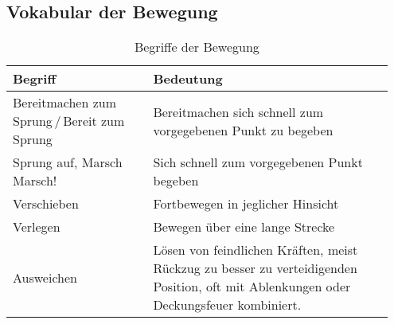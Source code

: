 \subsection{Vokabular der Bewegung}
	\begin{longtable}{P{0.35\linewidth}P{0.6\linewidth}}
		\caption[Vokabular Bewegung]{Begriffe der Bewegung} \\
		\toprule
		\textbf{Begriff} & \textbf{Bedeutung} \\
		\midrule
		Bereitmachen zum Sprung\,/\,Bereit zum Sprung & Bereitmachen sich schnell zum vorgegebenen Punkt zu begeben\\
		Sprung auf, Marsch Marsch! & Sich schnell zum vorgegebenen Punkt begeben\\
		Verschieben & Fortbewegen in jeglicher Hinsicht\\
		Verlegen & Bewegen über eine lange Strecke \\
		Ausweichen & Lösen von feindlichen Kräften, meist Rückzug zu besser zu verteidigenden Position, oft mit Ablenkungen oder Deckungsfeuer kombiniert.\\
		\bottomrule
	\end{longtable}
